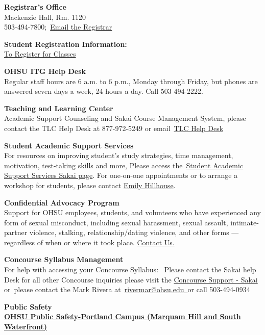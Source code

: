 \documentclass[
  letterpaper,
  DIV=11,
  numbers=noendperiod]{scrartcl}
\begin{document}
\textbf{Registrar's Office}\\
Mackenzie Hall, Rm. 1120\\
503-494-7800;~\href{mailto:regohsu@ohsu.edu}{Email the Registrar}

\textbf{Student Registration Information:}~\\
\href{http://www.ohsu.edu/xd/education/student-services/registrar/registration-information/index.cfm}{To
Register for Classes}

\textbf{OHSU ITG Help Desk}\\
Regular staff hours are 6 a.m. to 6 p.m., Monday through Friday, but
phones are answered seven days a week, 24 hours a day. Call 503
494-2222.

\textbf{Teaching and Learning Center}\\
Academic Support Counseling and Sakai Course Management System, please
contact the TLC Help Desk at 877-972-5249 or
email~\href{mailto:sakai@ohsu.edu}{TLC Help Desk}

\textbf{Student Academic Support Services\\
}For resources on improving student's study strategies, time management,
motivation, test-taking skills and more, Please access
the~\href{https://sakai.ohsu.edu/portal/site/Student_Support}{Student
Academic Support Services Sakai page}. For one-on-one appointments or to
arrange a workshop for students, please contact
\href{mailto:learningsupport@ohsu.edu}{Emily Hillhouse}.

\textbf{Confidential Advocacy Program\\
}Support for OHSU employees, students, and volunteers who have
experienced any form of sexual misconduct, including sexual harassment,
sexual assault, intimate-partner violence, stalking, relationship/dating
violence, and other forms --- regardless of when or where it took place.
\href{https://www.ohsu.edu/confidential-advocacy-program}{Contact Us.}

\textbf{Concourse Syllabus Management\\
}For help with accessing your Concourse Syllabus:~ Please contact the
Sakai help Desk for all other Concourse inquiries please visit the
\href{https://sakai.ohsu.edu/portal/site/concourse-syllabus-support}{Concourse
Support - Sakai} or~please contact the Mark Rivera
at~\href{mailto:rivermar@ohsu.edu}{rivermar@ohsu.edu~}or call
503-494-0934

\textbf{Public Safety\\
\href{https://www.ohsu.edu/xd/about/services/public-safety/}{OHSU Public
Safety-Portland Campus (Marquam Hill and South Waterfront)}}
\end{document}
